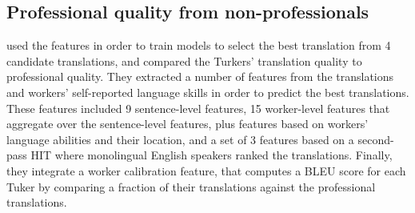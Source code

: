 \documentclass[11pt,letterpaper]{article}
\begin{document}

\subsection{Professional quality from non-professionals}

  used the features in order to train models to select the best translation from 4 candidate translations, and compared the Turkers' translation quality to professional quality.
They extracted a number of features from the translations and workers' self-reported language skills in order to predict the best translations. These features included 9 sentence-level features,
15 worker-level features that aggregate over the sentence-level features, plus features based on workers' language abilities and their location, and a set of 3 features based on a second-pass HIT where monolingual English speakers ranked the translations. Finally, they integrate a worker calibration feature, that computes a BLEU score for each Tuker by comparing a fraction of their translations against the professional translations. 
\end{document}
